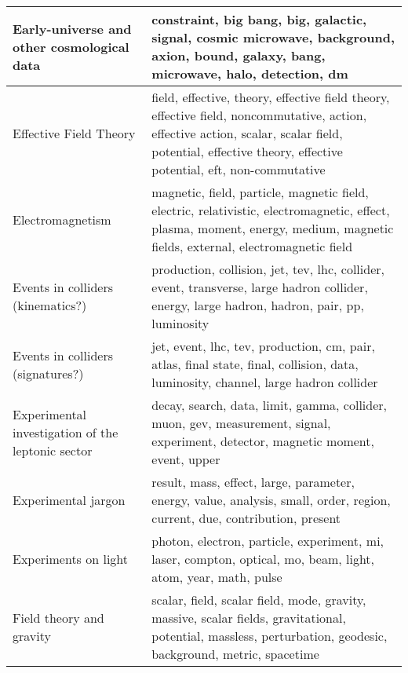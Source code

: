 \begin{longtable}[H]{p{}|p{}}
Early-universe and other cosmological data            &                                                                      constraint, big bang, big, galactic, signal, cosmic microwave, background, axion, bound, galaxy, bang, microwave, halo, detection, dm \\ \midrule
Effective Field Theory                                &  field, effective, theory, effective field theory, effective field, noncommutative, action, effective action, scalar, scalar field, potential, effective theory, effective potential, eft, non-commutative \\ \midrule
Electromagnetism                                      &                               magnetic, field, particle, magnetic field, electric, relativistic, electromagnetic, effect, plasma, moment, energy, medium, magnetic fields, external, electromagnetic field \\ \midrule
Events in colliders (kinematics?)                     &                                                               production, collision, jet, tev, lhc, collider, event, transverse, large hadron collider, energy, large hadron, hadron, pair, pp, luminosity \\ \midrule
Events in colliders (signatures?)                     &                                                                         jet, event, lhc, tev, production, cm, pair, atlas, final state, final, collision, data, luminosity, channel, large hadron collider \\ \midrule
Experimental investigation of the leptonic sector     &                                                                           decay, search, data, limit, gamma, collider, muon, gev, measurement, signal, experiment, detector, magnetic moment, event, upper \\ \midrule
Experimental jargon                                   &                                                                                 result, mass, effect, large, parameter, energy, value, analysis, small, order, region, current, due, contribution, present \\ \midrule
Experiments on light                                  &                                                                                              photon, electron, particle, experiment, mi, laser, compton, optical, mo, beam, light, atom, year, math, pulse \\ \midrule
Field theory and gravity                              &                                              scalar, field, scalar field, mode, gravity, massive, scalar fields, gravitational, potential, massless, perturbation, geodesic, background, metric, spacetime \\ \midrule

\end{longtable}
